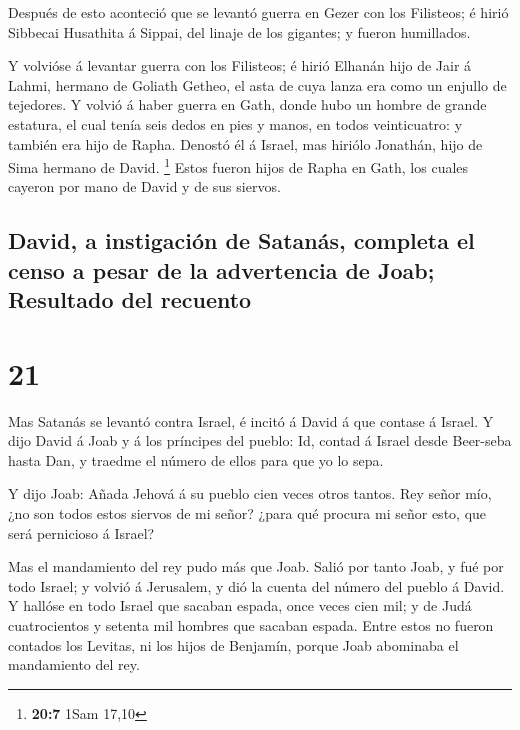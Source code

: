  Después de esto aconteció que se levantó guerra en Gezer
con los Filisteos; é hirió Sibbecai Husathita á Sippai, del linaje de
los gigantes; y fueron humillados.

 Y volvióse á levantar guerra con los Filisteos; é hirió
Elhanán hijo de Jair á Lahmi, hermano de Goliath Getheo, el asta de cuya
lanza era como un enjullo de tejedores.  Y volvió á haber
guerra en Gath, donde hubo un hombre de grande estatura, el cual tenía
seis dedos en pies y manos, en todos veinticuatro: y también era hijo de
Rapha.  Denostó él á Israel, mas hiriólo Jonathán, hijo de
Sima hermano de David. \footnote{\textbf{20:7} 1Sam 17,10}
 Estos fueron hijos de Rapha en Gath, los cuales cayeron
por mano de David y de sus siervos.

\hypertarget{david-a-instigaciuxf3n-de-satanuxe1s-completa-el-censo-a-pesar-de-la-advertencia-de-joab-resultado-del-recuento}{%
\subsection{David, a instigación de Satanás, completa el censo a pesar
de la advertencia de Joab; Resultado del
recuento}\label{david-a-instigaciuxf3n-de-satanuxe1s-completa-el-censo-a-pesar-de-la-advertencia-de-joab-resultado-del-recuento}}

\hypertarget{section-20}{%
\section{21}\label{section-20}}

 Mas Satanás se levantó contra Israel, é incitó á David á
que contase á Israel.  Y dijo David á Joab y á los
príncipes del pueblo: Id, contad á Israel desde Beer-seba hasta Dan, y
traedme el número de ellos para que yo lo sepa.

 Y dijo Joab: Añada Jehová á su pueblo cien veces otros
tantos. Rey señor mío, ¿no son todos estos siervos de mi señor? ¿para
qué procura mi señor esto, que será pernicioso á Israel?

 Mas el mandamiento del rey pudo más que Joab. Salió por
tanto Joab, y fué por todo Israel; y volvió á Jerusalem, y dió la cuenta
del número del pueblo á David.  Y hallóse en todo Israel
que sacaban espada, once veces cien mil; y de Judá cuatrocientos y
setenta mil hombres que sacaban espada.  Entre estos no
fueron contados los Levitas, ni los hijos de Benjamín, porque Joab
abominaba el mandamiento del rey.

